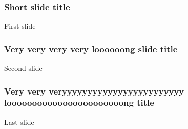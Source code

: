 \documentclass[table]{beamer}
\begin{document}
\frame{\titlepage}


\begin{frame}
\frametitle{Short slide title}
First slide
\end{frame}
\begin{frame}
\frametitle{Very very very very loooooong slide title}
Second slide
\end{frame}
\begin{frame}
\frametitle{Very very veryyyyyyyyyyyyyyyyyyyyyyyy   looooooooooooooooooooooong title}
Last slide
\end{frame}
\end{document}
